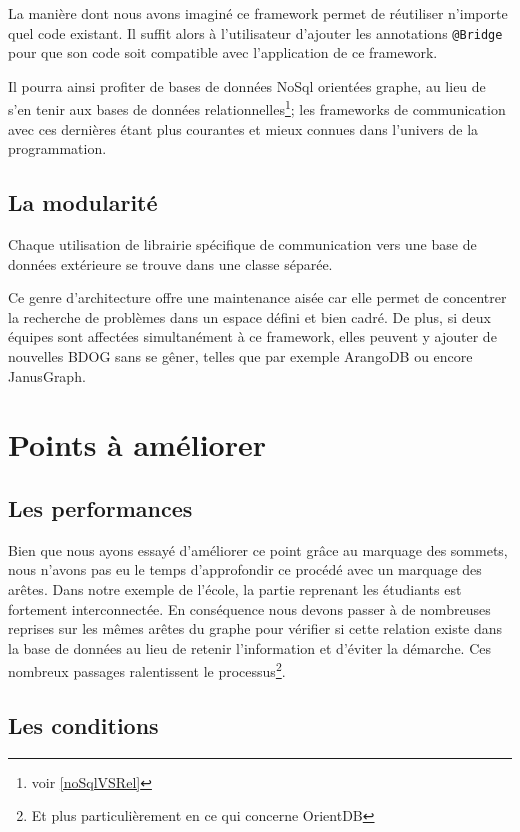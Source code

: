 \documentclass[a4paper,fleqn,12pt,oneside]{book}
\begin{document}
La manière dont nous avons imaginé ce framework permet de réutiliser n'importe quel code existant. Il suffit alors à l'utilisateur d'ajouter les annotations \texttt{@Bridge} pour que son code soit compatible avec l'application de ce framework. 

Il pourra ainsi profiter de bases de données NoSql orientées graphe, au lieu de s'en tenir aux bases de données relationnelles\footnote{voir \ref{noSqlVSRel}}; les frameworks de communication avec ces dernières étant plus courantes et mieux connues dans l'univers de la programmation.

\subsection{La modularité}

Chaque utilisation de librairie spécifique de communication vers une base de données extérieure se trouve dans une classe séparée.

Ce genre d'architecture offre une maintenance aisée car elle permet de concentrer la recherche de problèmes dans un espace défini et bien cadré. De plus, si deux équipes sont affectées simultanément à ce framework, elles peuvent y ajouter de nouvelles BDOG sans se gêner, telles que par exemple ArangoDB\cite{arangoSite} ou encore JanusGraph\cite{janusGraphSite}. 


\section{Points à améliorer}
\subsection{Les performances}

Bien que nous ayons essayé d'améliorer ce point grâce au marquage des sommets, nous n'avons pas eu le temps d'approfondir ce procédé avec un marquage des arêtes. Dans notre exemple de l'école, la partie reprenant les étudiants est fortement interconnectée. En conséquence nous devons passer à de nombreuses reprises sur les mêmes arêtes du graphe pour vérifier si cette relation existe dans la base de données au lieu de retenir l'information et d'éviter la démarche. Ces nombreux passages ralentissent le processus\footnote{Et plus particulièrement en ce qui concerne OrientDB}.

\subsection{Les conditions}
\end{document}
